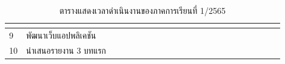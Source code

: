 \documentclass[12pt,oneside,openright,a4paper]{cpe-thai-project}
\begin{document}
\begin{table}[!ht]
{\begin{tabular}{|llllllllllllllllllllll|}
      \multicolumn{1}{l|}{\cellcolor[HTML]{FFCE93}} &
      \multicolumn{1}{l|}{\cellcolor[HTML]{FFCE93}} &
      \multicolumn{1}{l|}{\cellcolor[HTML]{FFCE93}} &
      \multicolumn{1}{l|}{\cellcolor[HTML]{FFCE93}} &
      \multicolumn{1}{l|}{\cellcolor[HTML]{FFCE93}} &
      \multicolumn{1}{l|}{\cellcolor[HTML]{FFCE93}} &
      \multicolumn{1}{l|}{\cellcolor[HTML]{FFCE93}} &
      \multicolumn{1}{l|}{\cellcolor[HTML]{FFCE93}} &
      \cellcolor[HTML]{FFCE93} \\ \hline
    \multicolumn{1}{|l|}{9} &
      \multicolumn{1}{l|}{พัฒนาเว็บแอปพลิเคชัน} &
      \multicolumn{1}{l|}{} &
      \multicolumn{1}{l|}{} &
      \multicolumn{1}{l|}{} &
      \multicolumn{1}{l|}{} &
      \multicolumn{1}{l|}{} &
      \multicolumn{1}{l|}{\cellcolor[HTML]{FFCE93}} &
      \multicolumn{1}{l|}{\cellcolor[HTML]{FFCE93}} &
      \multicolumn{1}{l|}{\cellcolor[HTML]{FFCE93}} &
      \multicolumn{1}{l|}{\cellcolor[HTML]{FFCE93}} &
      \multicolumn{1}{l|}{\cellcolor[HTML]{FFCE93}} &
      \multicolumn{1}{l|}{\cellcolor[HTML]{FFCE93}} &
      \multicolumn{1}{l|}{\cellcolor[HTML]{FFCE93}} &
      \multicolumn{1}{l|}{\cellcolor[HTML]{FFCE93}} &
      \multicolumn{1}{l|}{\cellcolor[HTML]{FFCE93}} &
      \multicolumn{1}{l|}{\cellcolor[HTML]{FFCE93}} &
      \multicolumn{1}{l|}{\cellcolor[HTML]{FFCE93}} &
      \multicolumn{1}{l|}{\cellcolor[HTML]{FFCE93}} &
      \multicolumn{1}{l|}{\cellcolor[HTML]{FFCE93}} &
      \multicolumn{1}{l|}{\cellcolor[HTML]{FFCE93}} &
      \cellcolor[HTML]{FFCE93} \\ \hline
    \multicolumn{1}{|l|}{10} &
      \multicolumn{1}{l|}{นำเสนอรายงาน   3 บทแรก} &
      \multicolumn{1}{l|}{} &
      \multicolumn{1}{l|}{} &
      \multicolumn{1}{l|}{} &
      \multicolumn{1}{l|}{} &
      \multicolumn{1}{l|}{} &
      \multicolumn{1}{l|}{} &
      \multicolumn{1}{l|}{} &
      \multicolumn{1}{l|}{} &
      \multicolumn{1}{l|}{} &
      \multicolumn{1}{l|}{} &
      \multicolumn{1}{l|}{} &
      \multicolumn{1}{l|}{} &
      \multicolumn{1}{l|}{} &
      \multicolumn{1}{l|}{} &
      \multicolumn{1}{l|}{} &
      \multicolumn{1}{l|}{} &
      \multicolumn{1}{l|}{\cellcolor[HTML]{FFCE93}} &
      \multicolumn{1}{l|}{} &
      \multicolumn{1}{l|}{} &
       \\ \hline
    \end{tabular}%
    }
    \caption{\centering  ตารางแสดงเวลาดำเนินงานของภาคการเรียนที่ 1/2565} \label{tbl:working1}
\end{table}

\end{document}
